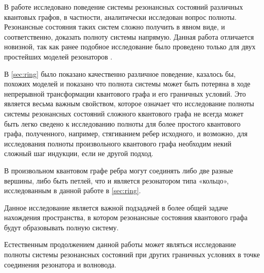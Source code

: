 \startconclusionpage

В работе исследовано поведение системы резонансных состояний различных квантовых графов, в частности, аналитически исследован вопрос полноты. Резонансные состояния таких систем сложно получить в явном виде, и соответственно, доказать полноту системы напрямую. Данная работа отличается новизной, так как ранее подобное исследование было проведено только для двух простейших моделей резонаторов \cite{spectralpavlov16}.

В \autoref{sec:ring} было показано качественно различное поведение, казалось бы, похожих моделей и показано что полнота системы может быть потеряна в ходе непрерывной трансформации квантового графа и его граничных условий. Это является весьма важным свойством, которое означает что исследование полноты системы резонансных состояний сложного квантового графа не всегда может быть легко сведено к исследованию полноты для более простого квантового графа, полученного, например, стягиванием ребер исходного, и возможно, для исследования полноты произвольного квантового графа необходим некий сложный шаг индукции, если не другой подход.

В произвольном квантовом графе ребра могут соединять либо две разные вершины, либо быть петлей, что и является резонатором типа «кольцо», исследованным в данной работе в \autoref{sec:ring}. 

Данное исследование является важной подзадачей в более общей задаче нахождения пространства, в котором резонансные состояния квантового графа будут образовывать полную систему.

Естественным продолжением данной работы может являться исследование полноты системы резонансных состояний при других граничных условиях в точке соединения резонатора и волновода.
